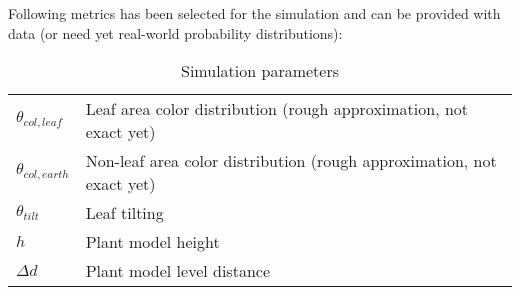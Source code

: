 Following metrics has been selected for the simulation and can be provided with data (or need yet real-world probability distributions):\\

\begin{table}
    \centering
    \begin{tabular}{ |l|l| }
        \hline
        $\theta_{col,leaf}$ & Leaf area color distribution (rough approximation, not exact yet) \\
        $\theta_{col,earth}$ & Non-leaf area color distribution (rough approximation, not exact yet)  \\
        $\theta_{tilt}$ & Leaf tilting \\
        $h$ & Plant model height  \\
        $\Delta d$ & Plant model level distance \\
        \hline
    \end{tabular}
    \caption{Simulation parameters}
\end{table}